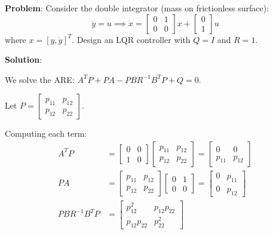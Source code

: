 \begin{examplebox}
\textbf{Problem}: Consider the double integrator (mass on frictionless surface):
\begin{equation}
\ddot{y} = u \implies \dot{x} = \begin{bmatrix} 0 & 1 \\ 0 & 0 \end{bmatrix} x + \begin{bmatrix} 0 \\ 1 \end{bmatrix} u
\end{equation}
where $x = [y, \dot{y}]^T$. Design an LQR controller with $Q = I$ and $R = 1$.

\textbf{Solution}:

We solve the ARE: $A^T P + PA - PBR^{-1}B^T P + Q = 0$.

Let $P = \begin{bmatrix} p_{11} & p_{12} \\ p_{12} & p_{22} \end{bmatrix}$.

Computing each term:
\begin{align}
A^T P &= \begin{bmatrix} 0 & 0 \\ 1 & 0 \end{bmatrix} \begin{bmatrix} p_{11} & p_{12} \\ p_{12} & p_{22} \end{bmatrix} = \begin{bmatrix} 0 & 0 \\ p_{11} & p_{12} \end{bmatrix} \\
PA &= \begin{bmatrix} p_{11} & p_{12} \\ p_{12} & p_{22} \end{bmatrix} \begin{bmatrix} 0 & 1 \\ 0 & 0 \end{bmatrix} = \begin{bmatrix} 0 & p_{11} \\ 0 & p_{12} \end{bmatrix} \\
PBR^{-1}B^T P &= \begin{bmatrix} p_{12}^2 & p_{12}p_{22} \\ p_{12}p_{22} & p_{22}^2 \end{bmatrix}
\end{align}


\end{examplebox}
